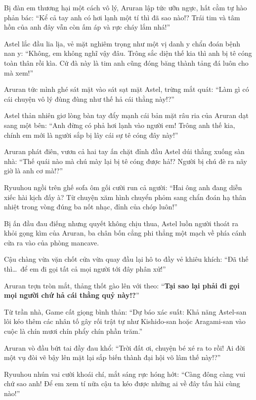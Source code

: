 \documentclass[../main.tex]{subfiles}
\begin{document}
Bị đàn em thương hại một cách vô lý, Aruran lập tức ưỡn ngực, hất cằm tự hào phản bác: ``Kể cả tay anh có hơi lạnh một tí thì đã sao nào!? Trái tim và tâm hồn của anh đây vẫn còn ấm áp và rực cháy lắm nhá!''

Astel lắc đầu lia lịa, vẻ mặt nghiêm trọng như một vị danh y chẩn đoán bệnh nan y: ``Không, em không nghĩ vậy đâu. Trông sắc diện thế kia thì anh bị tê cóng toàn thân rồi kìa. Cứ đà này là tim anh cũng đóng băng thành tảng đá luôn cho mà xem!''

Aruran tức mình ghé sát mặt vào sát sạt mặt Astel, trừng mắt quát: ``Làm gì có cái chuyện vô lý đùng đùng như thế hả cái thằng này!?''

Astel thản nhiên giơ lòng bàn tay đẩy mạnh cái bản mặt râu ria của Aruran dạt sang một bên: ``Anh đừng có phả hơi lạnh vào người em! Trông anh thế kia, chính em mới là người sắp bị lây cái sự tê cóng đây này!''

Aruran phát điên, vươn cả hai tay ấn chặt đỉnh đầu Astel dúi thẳng xuống sàn nhà: ``Thế quái nào mà chú mày lại bị tê cóng được hả!? Người bị chú đè ra nãy giờ là anh cơ mà!?''

Ryuuhou ngồi trên ghế sofa ôm gối cười run cả người: ``Hai ông anh đang diễn xiếc hài kịch đấy à? Từ chuyện xăm hình chuyển phỏm sang chẩn đoán hạ thân nhiệt trong vòng đúng ba nốt nhạc, đỉnh của chóp luôn!''

Bị ấn đầu đau điếng nhưng quyết không chịu thua, Astel luồn người thoát ra khỏi gọng kìm của Aruran, ba chân bốn cẳng phi thẳng một mạch về phía cánh cửa ra vào của phòng mancave.


Cậu chàng vừa vặn chốt cửa vừa quay đầu lại hô to đầy vẻ khiêu khích: ``Đã thế thì\dots\ để em đi gọi tất cả mọi người tới đây phân xử!''

Aruran trợn tròn mắt, thảng thốt gào lên với theo: ``\textbf{Tại sao lại phải đi gọi mọi người chứ hả cái thằng quỷ này!?}''

Từ trần nhà, Game cất giọng bình thản: ``Dự báo xác suất: Khả năng Astel-san lôi kéo thêm các nhân tố gây rối trật tự như Kishido-san hoặc Aragami-san vào cuộc là chín mươi chín phẩy chín phần trăm.''

Aruran vò đầu bứt tai đầy đau khổ: ``Trời đất ơi, chuyện bé xé ra to rồi! Ai đời một vụ đòi vẽ bậy lên mặt lại sắp biến thành đại hội võ lâm thế này!?''

Ryuuhou nhún vai cười khoái chí, mắt sáng rực hóng hớt: ``Càng đông càng vui chứ sao anh! Để em xem tí nữa cậu ta kéo được những ai về đây tấu hài cùng nào!''
\end{document}
